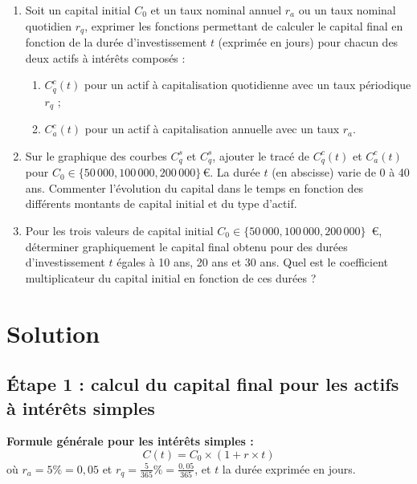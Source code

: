 \documentclass{article}
\begin{document}
\begin{enumerate}[label=\textbf{Q1.\arabic*}]
\begin{enumerate}[label=\textbf{Q2.\arabic*}]
              \item Soit un capital initial \( C_0 \) et un taux nominal annuel \( r_a \) ou un taux nominal quotidien \( r_q \), exprimer les fonctions permettant de calculer le capital final en fonction de la durée d'investissement \( t \) (exprimée en jours) pour chacun des deux actifs à intérêts composés :
                    \begin{enumerate}[label=(\alph*)]
                        \item \( C^c_q(t) \) pour un actif à capitalisation quotidienne avec un taux périodique \( r_q \) ;
                        \item \( C^c_a(t) \) pour un actif à capitalisation annuelle avec un taux \( r_a \).
                    \end{enumerate}
                        
              \item Sur le graphique des courbes $C^s_q$ et $C^s_q$, ajouter le tracé de \( C^c_q(t) \) et \( C^c_a(t) \) pour \( C_0 \in \{50\,000, 100\,000, 200\,000\} \, \text{€} \). La durée \( t \) (en abscisse) varie de 0 à 40 ans. Commenter l'évolution du capital dans le temps en fonction des différents montants de capital initial et du type d'actif.
                        
              \item Pour les trois valeurs de capital initial \( C_0 \in \{50\,000, 100\,000, 200\,000\} \)~€, déterminer graphiquement le capital final obtenu pour des durées d'investissement \( t \) égales à 10 ans, 20 ans et 30 ans. Quel est le coefficient multiplicateur du capital initial en fonction de ces durées ?
          \end{enumerate}
          
\end{enumerate}

\newpage
\section{Solution}
\subsection*{Étape 1 : calcul du capital final pour les actifs à intérêts simples}

\noindent
\textbf{Formule générale pour les intérêts simples :}
\[
    C(t) = C_0 \times \left(1 + r \times t\right)
\]
où $r_a = 5\% = 0,05$ et \( r_q = \frac{5}{365}\% = \frac{0,05}{365} \), et \( t \) la durée exprimée en jours.
\end{document}
